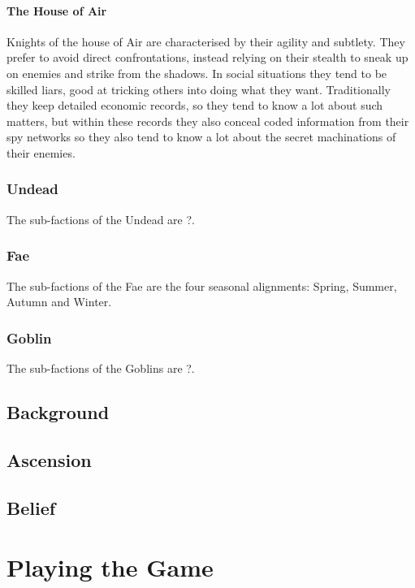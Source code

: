 \documentclass{report}
\begin{document}
\subsubsection{The House of Air}
Knights of the house of Air are characterised by their agility and subtlety. They prefer to avoid direct confrontations,
instead relying on their stealth to sneak up on enemies and strike from the shadows. In social situations they tend to be
skilled liars, good at tricking others into doing what they want. Traditionally they keep detailed economic records, so
they tend to know a lot about such matters, but within these records they also conceal coded information from their spy
networks so they also tend to know a lot about the secret machinations of their enemies.

\subsection{Undead}
The sub-factions of the Undead are ?.

\subsection{Fae}
The sub-factions of the Fae are the four seasonal alignments: Spring, Summer, Autumn and Winter.

\subsection{Goblin}
The sub-factions of the Goblins are ?.


\section{Background}

\section{Ascension}

\section{Belief}

\chapter{Playing the Game}
\end{document}
